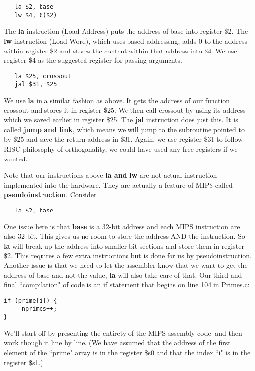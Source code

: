 \documentclass[11pt]{article}
\begin{document}
\begin{verbatim}
   la $2, base
   lw $4, 0($2)
\end{verbatim}

The {\bf la} instruction (Load Address) puts the address of base into register \$2. The {\bf lw} instruction (Load Word), which uses based addressing, adds 0 to the address within register \$2 and stores the content within that address into \$4. We use register \$4 as the suggested register for passing arguments.

\begin{verbatim}
   la $25, crossout
   jal $31, $25
\end{verbatim}

We use {\bf la} in a similar fashion as above. It gets the address of our function crossout and stores it in register \$25. We then call crossout by using its address which we saved earlier in register \$25. The {\bf jal} instruction does just this. It is called {\bf jump and link}, which means we will jump to the subroutine pointed to by \$25 and save the return address in \$31. Again, we use register \$31 to follow RISC philosophy of orthogonality, we could have used any free registers if we wanted.

Note that our instructions above {\bf la and lw} are not actual instruction implemented into the hardware. They are actually a feature of MIPS called {\bf pseudoinstruction}. Consider 

\begin{verbatim}
   la $2, base
\end{verbatim}

One issue here is that {\bf base} is a 32-bit address and each MIPS instruction are also 32-bit. This gives us no room to store the address AND the instruction. So {\bf la} will break up the address into smaller bit sections and store them in register \$2. This requires a few extra instructions but is done for us by pseudoinstruction. Another issue is that we need to let the assembler know that we want to get the address of base and not the value, {\bf la} will also take care of that.
Our third and final ``compilation" of code is an if statement that begins on line 104 in Primes.c:
\begin{verbatim}
if (prime[i]) {
     nprimes++;
}
\end{verbatim}
We'll start off by presenting the entirety of the MIPS assembly code, and then work though it line by line. (We have assumed that the address of the first element of the ``prime" array is in the register \$s0 and that the index ``i" is in the register \$s1.)
\end{document}
